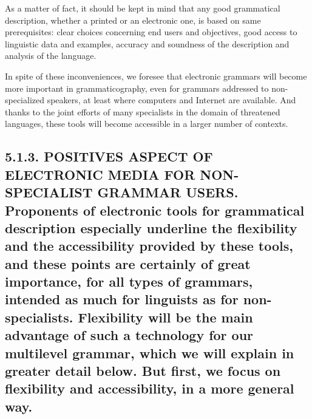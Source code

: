 \documentclass[letterpaper]{article}
\begin{document}
As a matter of fact, it should be kept in mind that any good grammatical description, whether a printed or an electronic one, is based on same prerequisites: clear choices concerning end users and objectives, good access to linguistic data and examples, accuracy and soundness of the description and analysis of the language.

In spite of these inconveniences, we foresee that electronic grammars will become more important in grammaticography, even for grammars addressed to non-specialized speakers, at least where computers and Internet are available. And thanks to the joint efforts of many specialists in the domain of threatened languages, these tools will become accessible in a larger number of contexts.

\subsection[\ 5.1.3. POSITIVES ASPECT OF ELECTRONIC MEDIA FOR NON{}-SPECIALIST GRAMMAR USERS. Proponents of electronic tools for grammatical description especially underline the flexibility and the accessibility provided by these tools, and these points are certainly of great importance, for all types of grammars, intended as much for linguists as for non{}-specialists. Flexibility will be the main advantage of such a technology for our multilevel grammar, which we will explain in greater detail below. But first, we focus on flexibility and accessibility, in a more general way.]{ 5.1.3. POSITIVES ASPECT OF ELECTRONIC MEDIA FOR NON-SPECIALIST GRAMMAR USERS. \textmd{Proponents of electronic tools for grammatical description }\textmd{especially }\textmd{underline the flexibility and the accessibility }\textmd{provided }\textmd{by these tools, and these points are certainly of }\textmd{great }\textmd{importance, for all }\textmd{types }\textmd{of grammars, intended as much for linguists as for non-specialists. Flexibility will be the main advantage of such a technology for our multilevel grammar, }\textmd{which }\textmd{we will explain in }\textmd{greater }\textmd{detail}\textmd{ }\textmd{b}\textmd{elow. But firs}\textmd{t}\textmd{, }\textmd{we focus on flexibility and accessibility, in a more general way.}}
\end{document}
